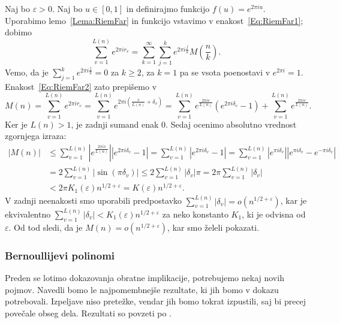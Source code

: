 \documentclass[mat1]{fmfdelo}
\begin{document}
Naj bo $\varepsilon > 0$. Naj bo $u \in [0,1]$ in definirajmo funkcijo $f(u) = e^{2\pi iu}$. Uporabimo lemo~\ref{Lema:RiemFar} in funkcijo vstavimo v enakost~\eqref{Eq:RiemFar1}; dobimo
\begin{equation}
\label{Eq:RiemFar2}
	\sum_{v=1}^{L(n)} e^{2\pi i r_{v}} = \sum_{k=1}^{\infty} \sum_{j=1}^{k} e^{2\pi i \frac{j}{k}} M \left(\frac{n}{k} \right).
\end{equation}
Vemo, da je $\sum_{j=1}^{k} e^{2\pi i \frac{j}{k}} = 0$ za $k \geq 2$, za $k=1$ pa se vsota poenostavi v $e^{2\pi i} = 1$.
Enakost~\eqref{Eq:RiemFar2} zato prepišemo v 
\[ M(n) = \sum_{v=1}^{L(n)} e^{2\pi i r_{v}} = \sum_{v=1}^{L(n)} e^{2\pi i \left(\frac{v}{L(n)} + \delta_{v} \right)} 
	   = \sum_{v=1}^{L(n)} e^{ \frac{2\pi i v}{L(n)} } \left(e^{2\pi i \delta_{v}} - 1 \right) + \sum_{v=1}^{L(n)} e^{ \frac{2\pi iv}{L(n)} }. \]
Ker je $L(n) > 1$, je zadnji sumand enak $0$. Sedaj ocenimo absolutno vrednost zgornjega izraza:
\begin{align*} 
|M(n)| &\leq \sum_{v=1}^{L(n)} \left|e^{ \frac{2\pi i v}{L(n)} } \right| \left|e^{2\pi i \delta_{v}} - 1 \right| 
	= \sum_{v=1}^{L(n)} \left|e^{2\pi i \delta_{v}} - 1 \right|
	= \sum_{v=1}^{L(n)} \left|e^{\pi i \delta_{v} } \right| \left|e^{\pi i \delta_{v}} - e^{-\pi i \delta_{v}}\right| \\
	&= 2 \sum_{v=1}^{L(n)} |\sin{(\pi \delta_{v})}| \leq 2 \sum_{v=1}^{L(n)} |\delta_{v}| \pi = 2 \pi \sum_{v=1}^{L(n)} |\delta_{v}| \\
	&< 2 \pi K_{1}(\varepsilon) n^{1/2 + \varepsilon} = K(\varepsilon) n^{1/2 + \varepsilon}.
\end{align*}
V zadnji neenakosti smo uporabili predpostavko $ \sum_{v=1}^{L(n)}|\delta_{v}| = o(n^{1/2+\varepsilon}) $, kar je ekvivalentno 
$ \sum_{v=1}^{L(n)}|\delta_{v}| < K_{1}(\varepsilon) n^{1/2+\varepsilon}$ za neko konstanto $K_{1}$, ki je odvisna od $\varepsilon$.
Od tod sledi, da je $M(n) = o(n^{1/2 + \varepsilon})$, kar smo želeli pokazati.

\subsubsection{Bernoullijevi polinomi}

Preden se lotimo dokazovanja obratne implikacije, potrebujemo nekaj novih pojmov. Navedli bomo le najpomembnejše rezultate, ki jih bomo v dokazu potrebovali. Izpeljave niso pretežke, vendar jih bomo tokrat izpustili, saj bi precej povečale obseg dela. Rezultati so povzeti po \cite[poglavje 6.2]{zetafunction}.
\end{document}
